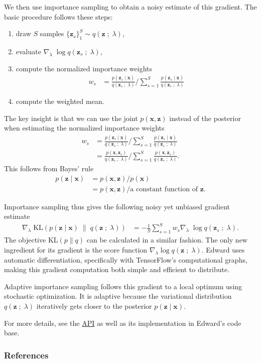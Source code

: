 We then use importance sampling to obtain a noisy estimate of this gradient.
The basic procedure follows these steps:
\begin{enumerate}
  \item draw $S$ samples $\{\mathbf{z}_s\}_1^S \sim q(\mathbf{z}\;;\;\lambda)$,
  \item evaluate $\nabla_\lambda\; \log q(\mathbf{z}_s\;;\;\lambda)$,
  \item compute the normalized importance weights
  \begin{align*}
    w_s
    &=
    \frac{p(\mathbf{z}_s \mid \mathbf{x})}{q(\mathbf{z}_s\;;\;\lambda)}
    \Bigg/
    \sum_{s=1}^{S}
    \frac{p(\mathbf{z}_s \mid \mathbf{x})}{q(\mathbf{z}_s\;;\;\lambda)}
  \end{align*}
  \item compute the weighted mean.
\end{enumerate}
The key insight is that we can use the joint $p(\mathbf{x},\mathbf{z})$ instead of the posterior
when estimating the normalized importance weights
\begin{align*}
  w_s
  &=
  \frac{p(\mathbf{z}_s \mid \mathbf{x})}{q(\mathbf{z}_s\;;\;\lambda)}
  \Bigg/
  \sum_{s=1}^{S}
  \frac{p(\mathbf{z}_s \mid \mathbf{x})}{q(\mathbf{z}_s\;;\;\lambda)} \\
  &=
  \frac{p(\mathbf{x}, \mathbf{z}_s)}{q(\mathbf{z}_s\;;\;\lambda)}
  \Bigg/
  \sum_{s=1}^{S}
  \frac{p(\mathbf{x}, \mathbf{z}_s)}{q(\mathbf{z}_s\;;\;\lambda)}.
\end{align*}
This follows from Bayes' rule
\begin{align*}
  p(\mathbf{z} \mid \mathbf{x})
  &=
  p(\mathbf{x}, \mathbf{z}) / p(\mathbf{x})\\
  &=
  p(\mathbf{x}, \mathbf{z}) / \text{a constant function of }\mathbf{z}.
\end{align*}

Importance sampling thus gives the following noisy yet unbiased gradient
estimate
\begin{align*}
\nabla_\lambda\;
  \text{KL}(
  p(\mathbf{z} \mid \mathbf{x})
  \;\|\;
  q(\mathbf{z}\;;\;\lambda)
  )
  &=
  -
  \frac{1}{S}
  \sum_{s=1}^S
  w_s
  \nabla_\lambda\; \log q(\mathbf{z}_s\;;\;\lambda).
\end{align*}
The objective $\text{KL}(p\|q)$ can be calculated in a similar fashion.
The only new ingredient for its gradient is the score function
$\nabla_\lambda \log q(\mathbf{z}\;;\;\lambda)$.  Edward uses automatic
differentiation, specifically with TensorFlow's computational graphs,
making this gradient computation both simple and efficient to
distribute.

Adaptive importance sampling follows this gradient to a local optimum using
stochastic optimization. It is adaptive because the variational distribution
$q(\mathbf{z}\;;\;\lambda)$ iteratively gets closer to the posterior $p(\mathbf{z} \mid \mathbf{x})$.

For more details, see the \href{/api/}{API} as well as its
implementation in Edward's code base.

\subsubsection{References}\label{references}
